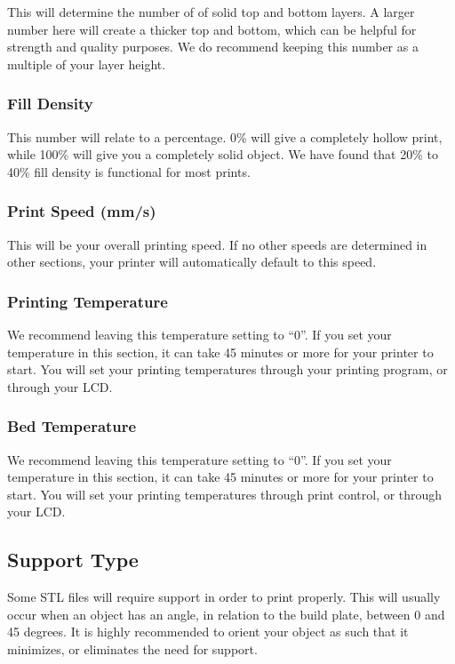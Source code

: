 This will determine the number of of solid top and bottom layers. A larger number here will create a thicker top and bottom, which can be helpful for strength and quality purposes. We do recommend keeping this number as a multiple of your layer height.

\subsubsection{Fill Density}

This number will relate to a percentage. 0\% will give a completely hollow print, while 100\% will give you a completely solid object. We have found that 20\% to 40\% fill density is functional for most prints.

\subsubsection{Print Speed (mm/s)}

This will be your overall printing speed. If no other speeds are determined in other sections, your printer will automatically default to this speed. 

\subsubsection{Printing Temperature}

We recommend leaving this temperature setting to “0”. If you set your temperature in this section, it can take 45 minutes or more for your printer to start. You will set your printing temperatures through your printing program, or through your LCD.

\subsubsection{Bed Temperature}

We recommend leaving this temperature setting to “0”. If you set your temperature in this section, it can take 45 minutes or more for your printer to start. You will set your printing temperatures through print control, or through your LCD.

\subsection{Support Type}

Some STL files will require support in order to print properly. This will usually occur when an object has an angle, in relation to the build plate, between 0 and 45 degrees. It is highly recommended to orient your object as such that it minimizes, or eliminates the need for support.

